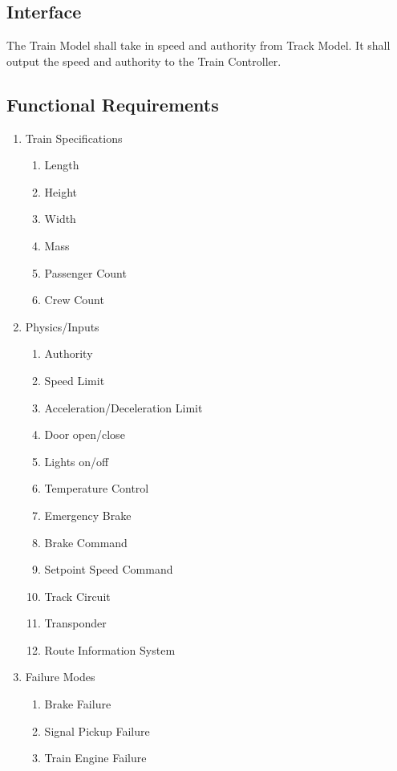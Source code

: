 \documentclass{scrreprt}
\begin{document}
\subsection{Interface}
The Train Model shall take in speed and authority from Track Model. It shall
output the speed and authority to the Train Controller.

\subsection{Functional Requirements}
\begin{enumerate}
  \item Train Specifications
   \begin{enumerate}
    \item Length
    \item Height
    \item Width
    \item Mass
    \item Passenger Count
    \item Crew Count
   \end{enumerate}
  \item Physics/Inputs
  \begin{enumerate}
   \item Authority
   \item Speed Limit
   \item Acceleration/Deceleration Limit
   \item Door open/close
   \item Lights on/off
   \item Temperature Control
   \item Emergency Brake
   \item Brake Command
   \item Setpoint Speed Command
   \item Track Circuit
   \item Transponder
   \item Route Information System
  \end{enumerate}
  \item Failure Modes
    \begin{enumerate}
     \item Brake Failure
     \item Signal Pickup Failure
     \item Train Engine Failure
    \end{enumerate}
\end{enumerate}
\end{document}
